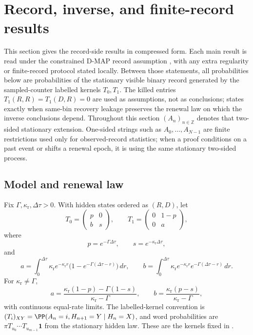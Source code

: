 \section{Record, inverse, and finite-record results}\label{sec:records}

This section gives the record-side results in compressed form.  Each main
result is read under the constrained D-MAP record assumption
, with any extra regularity or
finite-record protocol stated locally.  Between those statements, all
probabilities below are probabilities of the stationary visible binary record
generated by the sampled-counter labelled kernels \(T_0,T_1\).
The killed entries \(T_1(R,R)=T_1(D,R)=0\) are used as assumptions, not as
conclusions;  states exactly
when same-bin recovery leakage preserves the renewal law on which the inverse
conclusions depend.
Throughout this section \((A_n)_{n\in\mathbb Z}\) denotes that two-sided
stationary extension.
One-sided strings such as \(A_0,\ldots,A_{N-1}\) are finite restrictions used
only for observed-record statistics; when a proof conditions on a past event
or shifts a renewal epoch, it is using the same stationary two-sided process.

\subsection{Model and renewal law}

\begin{proposition}\label{prop:instrument-kernels-main}
Fix \(\Gamma,\kappa_{\mathrm r},\Delta\tau>0\).  With hidden states ordered as
\((R,D)\), let
\begin{equation}\label{eq:t0-t1-main}
T_0=
\begin{pmatrix}
p&0\\ b&s
\end{pmatrix},
\qquad
T_1=
\begin{pmatrix}
0&1-p\\0&a
\end{pmatrix},
\end{equation}
where
\begin{equation}\label{eq:p-c-main}
p=e^{-\Gamma\Delta\tau},
\qquad
s=e^{-\kappa_{\mathrm r}\Delta\tau},
\end{equation}
and
\begin{equation}\label{eq:a-b-main}
a=\int_0^{\Delta\tau}\kappa_{\mathrm r}e^{-\kappa_{\mathrm r}r}
\bigl(1-e^{-\Gamma(\Delta\tau-r)}\bigr)\,dr,
\qquad
b=\int_0^{\Delta\tau}\kappa_{\mathrm r}e^{-\kappa_{\mathrm r}r}
e^{-\Gamma(\Delta\tau-r)}\,dr .
\end{equation}
For \(\kappa_{\mathrm r}\ne\Gamma\),
\[
a=\frac{\kappa_{\mathrm r}(1-p)-\Gamma(1-s)}
        {\kappa_{\mathrm r}-\Gamma},
\qquad
b=\frac{\kappa_{\mathrm r}(p-s)}
        {\kappa_{\mathrm r}-\Gamma},
\]
with continuous equal-rate limits.  The labelled-kernel convention is
\((T_i)_{XY}=\PP(A_n=i,H_{n+1}=Y\mid H_n=X)\), and word probabilities are
\(\pi T_{u_0}\cdots T_{u_{m-1}}\mathbf1\) from the stationary hidden law.
These are the kernels fixed in .
\end{proposition}

